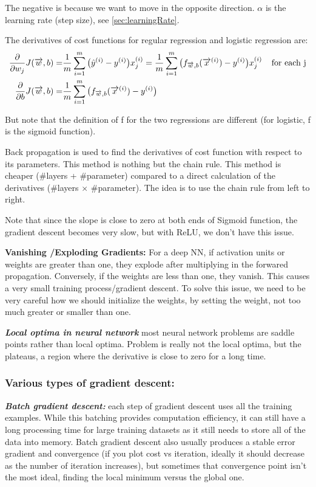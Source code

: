 \documentclass[12pt]{report}
\begin{document}
The negative is because we want to move in the opposite direction. $\alpha$ is the learning rate (step size), see \ref{sec:learningRate}.

The derivatives of cost functions for regular regression and logistic regression are:
\begin{equation}
\label{eq:derivatives}
\begin{split}
\frac{\partial}{\partial w_j} J(\overrightarrow{w},b) =& \frac{1}{m} \sum_{i=1}^{m} \big(\hat{y}^{(i)} - y^{(i)} \big) x_j^{(i)} = \frac{1}{m} \sum_{i=1}^{m} \big( f_{\overrightarrow{w},b} (\overrightarrow{x}^{(i)}) - y^{(i)} \big) x_j^{(i)} \text{\: \: for each j} \\
\frac{\partial}{\partial b} J(\overrightarrow{w},b)   =& \frac{1}{m} \sum_{i=1}^{m} \big( f_{\overrightarrow{w},b} (\overrightarrow{x}^{(i)})  - y^{(i)} \big)
\end{split}
\end{equation}

But note that the definition of f for the two regressions are different (for logistic, f is the sigmoid function).

Back propagation is used to find the derivatives of cost function with respect to its parameters. This method is nothing but the chain rule. This method is cheaper (\#layers + \#parameter) compared to a direct calculation of the derivatives (\#layers $\times$ \#parameter). The idea is to use the chain rule from left to right.

Note that since the slope is close to zero at both ends of Sigmoid function, the gradient descent becomes very slow, but with ReLU, we don't have this issue.


\textbf{Vanishing /Exploding Gradients:}
For a deep NN, if activation units or weights are greater than one, they explode after multiplying in the forwared propagation. Conversely, if the weights are less than one, they vanish. This causes a very small training process/gradient descent. To solve this issue, we need to be very careful how we should initialize the weights, by setting the weight, not too much greater or smaller than one.

\textbf{\textit{Local optima in neural network}} most neural network problems are saddle points rather than local optima. Problem is really not the local optima, but the plateaus, a region where the derivative is close to zero for a long time.


\subsubsection{Various types of gradient descent:}
\textbf{\textit{Batch gradient descent:}} each step of gradient descent uses all the training examples. While this batching provides computation efficiency, it can still have a long processing time for large training datasets as it still needs to store all of the data into memory. Batch gradient descent also usually produces a stable error gradient and convergence (if you plot cost vs iteration, ideally it should decrease as the number of iteration increases), but sometimes that convergence point isn't the most ideal, finding the local minimum versus the global one.
\end{document}
